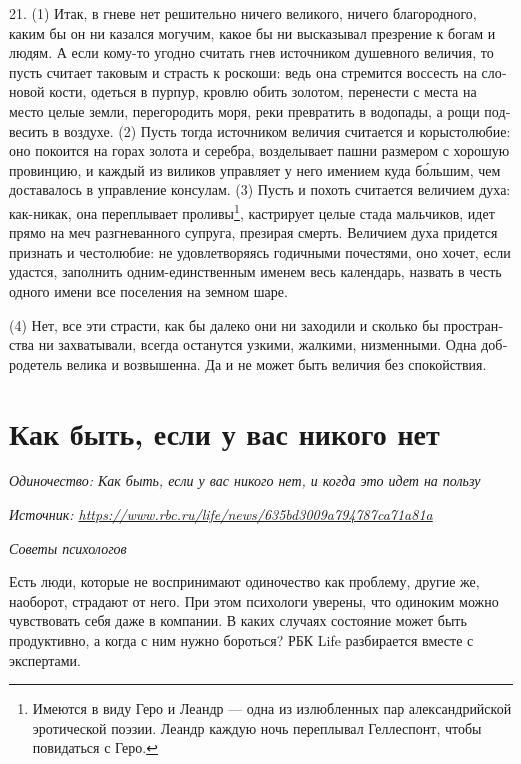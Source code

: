 21. (1) Итак, в гне­ве нет реши­тель­но ниче­го вели­ко­го, ниче­го бла­го­род­но­го, каким бы он ни казал­ся могу­чим, какое бы ни выска­зы­вал пре­зре­ние к богам и людям.
А если кому-то угод­но счи­тать гнев источ­ни­ком душев­но­го вели­чия, то пусть счи­та­ет тако­вым и страсть к рос­ко­ши: ведь она стре­мит­ся вос­сесть на сло­но­вой кости, одеть­ся в пур­пур, кров­лю обить золо­том, пере­не­сти с места на место целые зем­ли, пере­го­ро­дить моря, реки пре­вра­тить в водо­па­ды, а рощи под­ве­сить в возду­хе.
(2) Пусть тогда источ­ни­ком вели­чия счи­та­ет­ся и коры­сто­лю­бие: оно поко­ит­ся на горах золота и серебра, возде­лы­ва­ет паш­ни раз­ме­ром с хоро­шую про­вин­цию, и каж­дый из вили­ков управ­ля­ет у него име­ни­ем куда б\'{о}льшим, чем доста­ва­лось в управ­ле­ние кон­су­лам. (3) Пусть и похоть счи­та­ет­ся вели­чи­ем духа: как-никак, она пере­плы­ва­ет проливы\footnote{Име­ют­ся в виду Геро и Леандр --- одна из излюб­лен­ных пар алек­сан­дрий­ской эро­ти­че­ской поэ­зии. Леандр каж­дую ночь пере­плы­вал Гел­лес­понт, чтобы повидать­ся с Геро.}, каст­ри­ру­ет целые ста­да маль­чи­ков, идет пря­мо на меч раз­гне­ван­но­го супру­га, пре­зи­рая смерть. Вели­чи­ем духа при­дет­ся при­знать и често­лю­бие: не удо­вле­тво­ря­ясь годич­ны­ми поче­стя­ми, оно хочет, если удаст­ся, запол­нить одним-един­ст­вен­ным име­нем весь кален­дарь, назвать в честь одно­го име­ни все посе­ле­ния на зем­ном шаре.

(4) Нет, все эти стра­сти, как бы дале­ко они ни захо­ди­ли и сколь­ко бы про­стран­ства ни захва­ты­ва­ли, все­гда оста­нут­ся узки­ми, жал­ки­ми, низ­мен­ны­ми. Одна доб­ро­де­тель вели­ка и воз­вы­шен­на. Да и не может быть вели­чия без спо­кой­ст­вия.


\newpage
\section{Как быть, если у вас никого нет}

\textit{Одиночество: Как быть, если у вас никого нет, и когда это идет на пользу}

\textit{Источник: \url{https://www.rbc.ru/life/news/635bd3009a794787ca71a81a}}

\textit{Советы психологов}

Есть люди, которые не воспринимают одиночество как проблему,
другие же, наоборот, страдают от него.
При этом психологи уверены, что одиноким можно чувствовать
себя даже в компании.
В каких случаях состояние может быть продуктивно, а когда
с ним нужно бороться? РБК Life разбирается вместе с экспертами.

